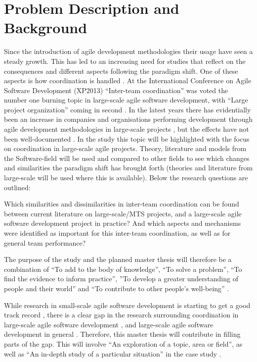 \section{Problem Description and Background}
\label{pdab}

Since the introduction of agile development methodologies their usage have seen a steady growth. This has led to an increasing need for studies that reflect on the consequences and different aspects following the paradigm shift. One of these aspects is how coordination is handled \cite{Agerfalk2006, Leffingwell2007, Cockburn2002, Batra2010}. At the International Conference on Agile Software Development (XP2013) ``Inter-team coordination'' was voted the number one burning topic in large-scale agile software development, with ``Large project organization'' coming in second \cite{Dingsoyr2013b}.  In the latest years there has evidentially been an increase in companies and organisations performing development through agile development methodologies in large-scale projects \cite{Paasivaara2012, Com2013, Vlietland2015, Lindvall2004, Dingsoyr2013b, Lee2008, Paasivaara2009}, but the effects have not been well-documented \cite{Pikkarainen2008, Paasivaara2012, Freudenberg2010, Haaster2014, Dingsoyr2013a, Reifer2003}. In the study this topic will be highlighted with the focus on coordination in large-scale agile projects. Theory, literature and models from the Software-field will be used and compared to other fields to see which changes and similarities the paradigm shift has brought forth (theories and literature from large-scale will be used where this is available). Below the research questions are outlined:

\begin{fancyquotes}
Which similarities and dissimilarities in inter-team coordination can be found between current literature on large-scale/MTS projects, and a large-scale agile software development project in practice? And which aspects and mechanisms were identified as important for this inter-team coordination, as well as for general team performance?
\end{fancyquotes}

The purpose of the study and the planned master thesis will therefore be a combination of ``To add to the body of knowledge'', ``To solve a problem'', ``To find the evidence to inform practice'', ''To develop a greater understanding of people and their world'' and ``To contribute to other people's well-being'' \cite{Oates2006}.

While research in small-scale agile software development is starting to get a good track record \cite{Paasivaara2012, Haaster2014}, there is a clear gap in the research surrounding coordination in large-scale agile software development \cite{Pikkarainen2008, Paasivaara2012, Dingsoyr2013b}, and large-scale agile software development in general \cite{Freudenberg2010, Haaster2014}. Therefore, this master thesis will contribute in filling parts of the gap. This will involve ``An exploration of a topic, area or field'', as well as ``An in-depth study of a particular situation'' in the case study \cite{Oates2006}.

